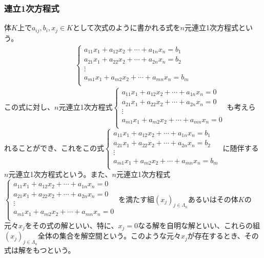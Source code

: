 \documentclass[dvipdfmx]{jsarticle}
\begin{document}
\subsubsection{連立1次方程式}%
\begin{dfn}
体$K$上で$a_{ij},b_{i},x_{j} \in K$として次式のように書かれる式を$n$元連立1次方程式という。
\begin{align*}
\left\{ \begin{matrix}
a_{11}x_{1} + a_{12}x_{2} + \cdots + a_{1n}x_{n} = b_{1} \\
a_{21}x_{1} + a_{22}x_{2} + \cdots + a_{2n}x_{n} = b_{2} \\
 \vdots \\
a_{m1}x_{1} + a_{m2}x_{2} + \cdots + a_{mn}x_{n} = b_{m} \\
\end{matrix} \right.
\end{align*}
この式に対し、$n$元連立1次方程式$\left\{ \begin{matrix}
a_{11}x_{1} + a_{12}x_{2} + \cdots + a_{1n}x_{n} = 0 \\
a_{21}x_{1} + a_{22}x_{2} + \cdots + a_{2n}x_{n} = 0 \\
 \vdots \\
a_{m1}x_{1} + a_{m2}x_{2} + \cdots + a_{mn}x_{n} = 0 \\
\end{matrix} \right.\ $も考えられることができ、これをこの式$\left\{ \begin{matrix}
a_{11}x_{1} + a_{12}x_{2} + \cdots + a_{1n}x_{n} = b_{1} \\
a_{21}x_{1} + a_{22}x_{2} + \cdots + a_{2n}x_{n} = b_{2} \\
 \vdots \\
a_{m1}x_{1} + a_{m2}x_{2} + \cdots + a_{mn}x_{n} = b_{m} \\
\end{matrix} \right.\ $に随伴する$n$元連立1次方程式という。また、$n$元連立1次方程式$\left\{ \begin{matrix}
a_{11}x_{1} + a_{12}x_{2} + \cdots + a_{1n}x_{n} = 0 \\
a_{21}x_{1} + a_{22}x_{2} + \cdots + a_{2n}x_{n} = 0 \\
 \vdots \\
a_{m1}x_{1} + a_{m2}x_{2} + \cdots + a_{mn}x_{n} = 0 \\
\end{matrix} \right.\ $を満たす組$\left( x_{j} \right)_{j \in \varLambda_{n}}$あるいはその体$K$の元々$x_{j}$をその式の解といい、特に、$x_{j} = 0$なる解を自明な解といい、これらの組$\left( x_{j} \right)_{j \in \varLambda_{n}}$全体の集合を解空間という。このような元々$x_{j}$が存在するとき、その式は解をもつという。
\end{dfn}
\end{document}
